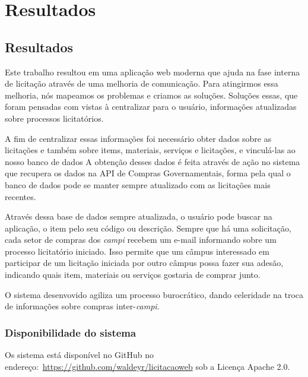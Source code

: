 \part{Resultados}

\chapter[Resultados]{Resultados}\label{Capitulo5}

Este trabalho resultou em uma aplicação web moderna que ajuda na fase interna de licitação através de uma melhoria de comunicação.
Para atingirmos essa melhoria, nós mapeamos os problemas e criamos as soluções.
Soluções essas, que foram pensadas com vistas à centralizar para o usuário, informações atualizadas sobre processos licitatórios.

A fim de centralizar essas informações foi necessário obter dados sobre as licitações e também sobre items, materiais, serviços e licitações, e vinculá-las ao nosso banco de dados
A obtenção desses dados é feita através de ação no sistema que recupera os dados na API de Compras Governamentais, forma pela qual o banco de dados pode se manter sempre atualizado com as licitações mais recentes.

Através dessa base de dados sempre atualizada, o usuário pode buscar na aplicação, o item pelo seu código ou descrição.
Sempre que há uma solicitação, cada setor de compras dos \textit{campi} recebem um e-mail informando sobre um processo licitatório iniciado.
Isso permite que um câmpus interessado em participar de um licitação iniciada por outro câmpus possa fazer sua adesão, indicando quais item, materiais ou serviços gostaria de comprar junto.

O sistema desenvovido agiliza um processo burocrático, dando celeridade na troca de informações sobre compras inter-\textit{campi}.


\section{Disponibilidade do sistema}

Os sistema está disponível no GitHub no endereço:~\url{https://github.com/waldeyr/licitacaoweb} sob a Licença Apache 2.0.




